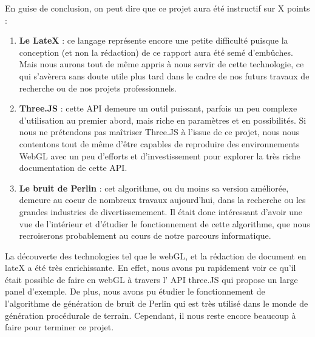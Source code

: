 En guise de conclusion, on peut dire que ce projet aura été instructif sur X points :
\vspace{0.5cm}
\begin{enumerate}
	\item \textbf{Le LateX} : ce langage représente encore une petite difficulté puisque la conception (et non la rédaction) de ce rapport aura été semé d'embûches. Mais nous aurons tout de même appris à nous servir de cette technologie, ce qui s'avèrera sans doute utile plus tard dans le cadre de nos futurs travaux de recherche ou de nos projets professionnels.
	\item \textbf{Three.JS} : cette API demeure un outil puissant, parfois un peu complexe d'utilisation au premier abord, mais riche en paramètres et en possibilités. Si nous ne prétendons pas maîtriser Three.JS à l'issue de ce projet, nous nous contentons tout de même d'être capables de reproduire des environnements WebGL avec un peu d'efforts et d'investissement pour explorer la très riche documentation de cette API.
	\item \textbf{Le bruit de Perlin} : cet algorithme, ou du moins sa version améliorée, demeure au coeur de nombreux travaux aujourd'hui, dans la recherche ou les grandes industries de divertissemement. Il était donc intéressant d'avoir une vue de l'intérieur et d'étudier le fonctionnement de cette algorithme, que nous recroiserons probablement au cours de notre parcours informatique.
\end{enumerate}

La découverte des technologies tel que le webGL, et la rédaction de document en lateX a été très enrichissante. En effet, nous avons pu rapidement voir ce qu'il était possible de faire en webGL à travers l' API three.JS qui propose un large panel d'exemple. De plus, nous avons pu étudier le fonctionnement de l'algorithme de génération de bruit de Perlin qui est très utilisé dans le monde de génération procédurale de terrain. Cependant, il nous reste encore beaucoup à faire pour terminer ce projet.

